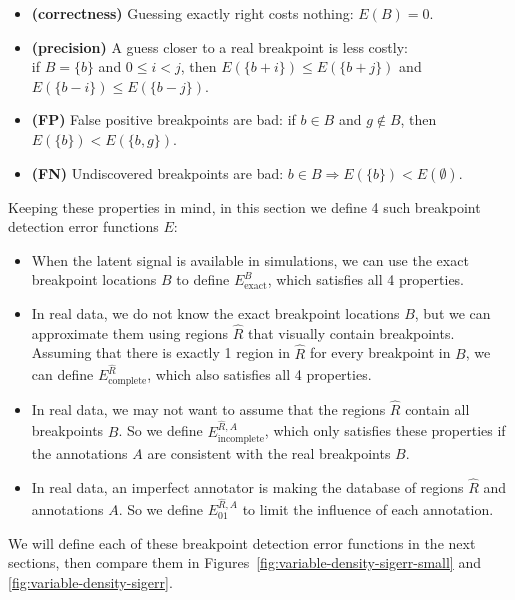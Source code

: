 \documentclass{jsfds} %
\begin{document}
\begin{itemize}
\item \textbf{(correctness)} Guessing exactly right costs nothing: ${E }(B)=0$.
\item \textbf{(precision)} A guess closer to a real breakpoint is less
  costly:\\if $B=\{b\}$ and $0\leq i<j$, then
  ${E }(\{b+i\})\leq{E }(\{b+j\})$ and
  ${E }(\{b-i\})\leq{E }(\{b-j\})$.
\item \textbf{(FP)} False positive breakpoints are
  bad: if $b\in B$ and $g\not\in B$, then ${E }(\{b\}) <
  {E }(\{b,g\})$.
\item \textbf{(FN)} Undiscovered breakpoints are bad:
  $b\in B\Rightarrow{E }(\{b\}) < {E }(\emptyset)$.
\end{itemize}

Keeping these properties in mind, in this section we define 4 such
breakpoint detection error functions $E$:
\begin{itemize}
\item When the latent signal is available in simulations, we can use
  the exact breakpoint locations $B$ to define $E^B_{\text{exact}}$,
  which satisfies all 4 properties.
\item In real data, we do not know the exact breakpoint locations $B$,
  but we can approximate them using regions $\hat R$ that visually
  contain breakpoints. Assuming that there is exactly 1 region in
  $\hat R$ for every breakpoint in $B$, we can define
  $E^{\hat R}_{\text{complete}}$, which also satisfies all 4 properties.
\item In real data, we may not want to assume that the regions $\hat
  R$ contain all breakpoints $B$. So we define $E^{\hat
    R,A}_{\text{incomplete}}$, which only satisfies these properties
  if the annotations $A$ are consistent with the real breakpoints $B$.
\item In real data, an imperfect annotator is making the database of
  regions $\hat R$ and annotations $A$. So we define $E_{01}^{\hat
    R,A}$ to limit the influence of each annotation.
\end{itemize}

We will define each of these breakpoint detection error functions in
the next sections, then compare them in
Figures~\ref{fig:variable-density-sigerr-small} and
\ref{fig:variable-density-sigerr}.
\end{document}
